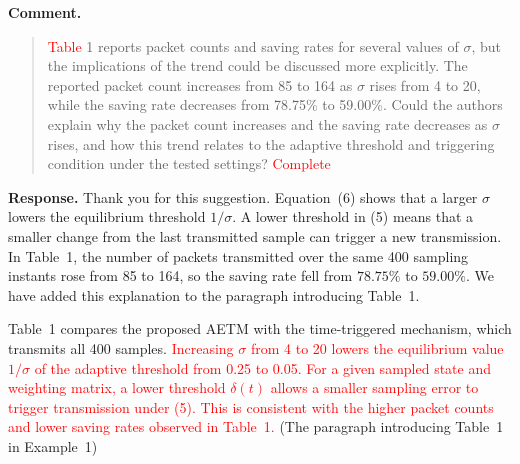 \documentclass[12pt,a4paper]{article}
\begin{document}
\textbf{Comment.}
\begin{quote}
\raggedright
\textcolor{red}{Table} 1 reports packet counts and saving rates for several values of $\sigma$, but the implications of the trend could be discussed more explicitly. The reported packet count increases from 85 to 164 as $\sigma$ rises from 4 to 20, while the saving rate decreases from 78.75\% to 59.00\%. Could the authors explain why the packet count increases and the saving rate decreases as $\sigma$ rises, and how this trend relates to the adaptive threshold and triggering condition under the tested settings? \textcolor{red}{Complete}
\end{quote}

\begingroup
\setlength{\parskip}{6pt}
\textbf{Response.}
Thank you for this suggestion. Equation~(6) shows that a larger $\sigma$ lowers the equilibrium threshold $1/\sigma$. A lower threshold in (5) means that a smaller change from the last transmitted sample can trigger a new transmission. In Table~1, the number of packets transmitted over the same 400 sampling instants rose from 85 to 164, so the saving rate fell from $78.75\%$ to $59.00\%$. We have added this explanation to the paragraph introducing Table~1.\par
\noindent Table~1 compares the proposed AETM with the time-triggered mechanism, which transmits all 400 samples. \textcolor{red}{Increasing $\sigma$ from 4 to 20 lowers the equilibrium value $1/\sigma$ of the adaptive threshold from 0.25 to 0.05. For a given sampled state and weighting matrix, a lower threshold $\delta(t)$ allows a smaller sampling error to trigger transmission under (5). This is consistent with the higher packet counts and lower saving rates observed in Table~1.} (The paragraph introducing Table~1 in Example~1)\par
\endgroup
\end{document}
